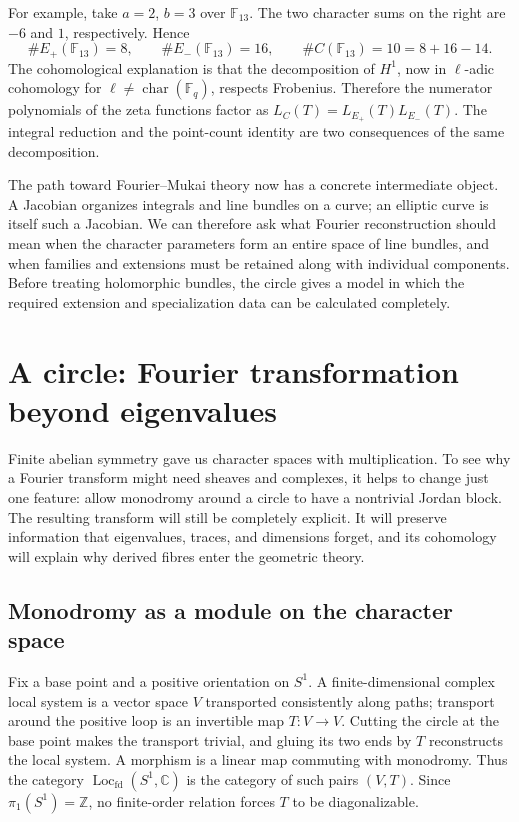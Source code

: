 \documentclass[11pt]{article}
\theoremstyle{remark}
\newcommand{\C}{\mathbb C}
\begin{document}
For example, take \(a=2\), \(b=3\) over \(\mathbb F_{13}\). The two character sums on the right are \(-6\) and \(1\), respectively. Hence
\[
\#E_+(\mathbb F_{13})=8,\qquad
\#E_-(\mathbb F_{13})=16,\qquad
\#C(\mathbb F_{13})=10=8+16-14.
\]
The cohomological explanation is that the decomposition of \(H^1\), now in \(\ell\)-adic cohomology for \(\ell\ne\operatorname{char}(\mathbb F_q)\), respects Frobenius. Therefore the numerator polynomials of the zeta functions factor as \(L_C(T)=L_{E_+}(T)L_{E_-}(T)\). The integral reduction and the point-count identity are two consequences of the same decomposition.

The path toward Fourier--Mukai theory now has a concrete intermediate object. A Jacobian organizes integrals and line bundles on a curve; an elliptic curve is itself such a Jacobian. We can therefore ask what Fourier reconstruction should mean when the character parameters form an entire space of line bundles, and when families and extensions must be retained along with individual components. Before treating holomorphic bundles, the circle gives a model in which the required extension and specialization data can be calculated completely.

\section{A circle: Fourier transformation beyond eigenvalues}
\label{circle:section}

Finite abelian symmetry gave us character spaces with multiplication. To see why a Fourier transform might need sheaves and complexes, it helps to change just one feature: allow monodromy around a circle to have a nontrivial Jordan block. The resulting transform will still be completely explicit. It will preserve information that eigenvalues, traces, and dimensions forget, and its cohomology will explain why derived fibres enter the geometric theory.

\subsection{Monodromy as a module on the character space}

Fix a base point and a positive orientation on \(S^1\). A finite-dimensional complex local system is a vector space \(V\) transported consistently along paths; transport around the positive loop is an invertible map \(T:V\to V\). Cutting the circle at the base point makes the transport trivial, and gluing its two ends by \(T\) reconstructs the local system. A morphism is a linear map commuting with monodromy. Thus the category \(\operatorname{Loc}_{\mathrm{fd}}(S^1,\C)\) is the category of such pairs \((V,T)\). Since \(\pi_1(S^1)=\mathbb Z\), no finite-order relation forces \(T\) to be diagonalizable.
\end{document}

